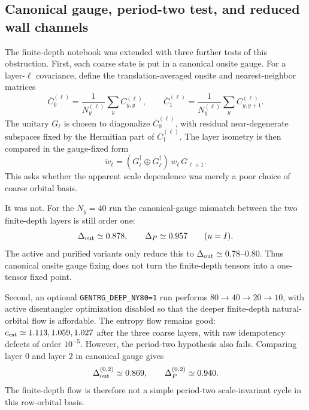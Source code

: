 \documentclass[aps,prb,twocolumn,floatfix]{revtex4-2}
\begin{document}
\subsection{Canonical gauge, period-two test, and reduced wall channels}

The finite-depth notebook was extended with three further tests of this
obstruction.  First, each coarse state is put in a canonical onsite gauge.
For a layer-\(\ell\) covariance, define the translation-averaged onsite and
nearest-neighbor matrices
\begin{equation}
  \overline C_0^{(\ell)}
  =
  \frac{1}{N_y^{(\ell)}}\sum_y C_{y,y}^{(\ell)},
  \qquad
  \overline C_1^{(\ell)}
  =
  \frac{1}{N_y^{(\ell)}}\sum_y C_{y,y+1}^{(\ell)} .
\end{equation}
The unitary \(G_\ell\) is chosen to diagonalize \(\overline C_0^{(\ell)}\),
with residual near-degenerate subspaces fixed by the Hermitian part of
\(\overline C_1^{(\ell)}\).  The layer isometry is then compared in the
gauge-fixed form
\begin{equation}
  \widetilde w_\ell
  =
  (G_\ell^\dagger\oplus G_\ell^\dagger)\,
  w_\ell\,G_{\ell+1}.
\end{equation}
This asks whether the apparent scale dependence was merely a poor choice of
coarse orbital basis.

It was not.  For the \(N_y=40\) run the canonical-gauge mismatch between the
two finite-depth layers is still order one:
\begin{equation}
  \Delta_{\rm out}\simeq0.878,\qquad
  \Delta_P\simeq0.957
  \qquad (u=I).
\end{equation}
The active and purified variants only reduce this to
\(\Delta_{\rm out}\simeq0.78\)--\(0.80\).  Thus canonical onsite gauge fixing
does not turn the finite-depth tensors into a one-tensor fixed point.

Second, an optional \texttt{GENTRG\_DEEP\_NY80=1} run performs
\(80\to40\to20\to10\), with active disentangler optimization disabled so that
the deeper finite-depth natural-orbital flow is affordable.  The entropy flow
remains good: \(c_{\rm est}\simeq1.113,1.059,1.027\) after the three coarse
layers, with raw idempotency defects of order \(10^{-5}\).  However, the
period-two hypothesis also fails.  Comparing layer \(0\) and layer \(2\) in
canonical gauge gives
\begin{equation}
  \Delta_{\rm out}^{(0,2)}\simeq0.869,\qquad
  \Delta_P^{(0,2)}\simeq0.940 .
\end{equation}
The finite-depth flow is therefore not a simple period-two scale-invariant
cycle in this row-orbital basis.
\end{document}
